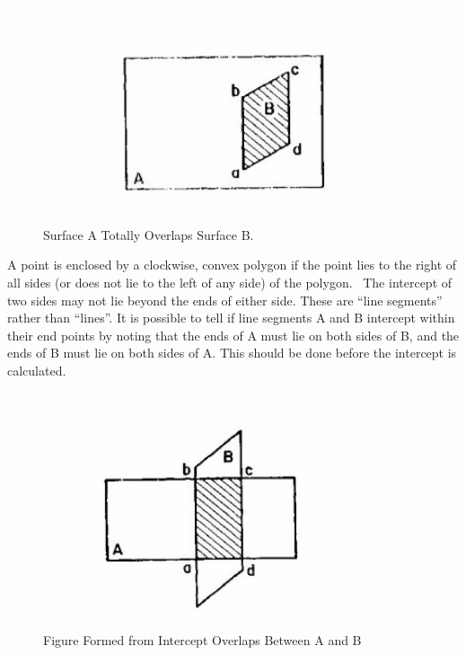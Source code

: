\begin{figure}[hbtp] %
\centering
\includegraphics[width=0.9\textwidth, height=0.9\textheight, keepaspectratio=true]{media/image638.png}
\caption{  Surface A Totally Overlaps Surface B. \protect \label{fig:surface-a-totally-overlaps-surface-b.}}
\end{figure}

A point is enclosed by a clockwise, convex polygon if the point lies to the right of all sides (or does not lie to the left of any side) of the polygon.~ The intercept of two sides may not lie beyond the ends of either side. These are ``line segments'' rather than ``lines''. It is possible to tell if line segments A and B intercept within their end points by noting that the ends of A must lie on both sides of B, and the ends of B must lie on both sides of A. This should be done before the intercept is calculated.

\begin{figure}[hbtp] %
\centering
\includegraphics[width=0.9\textwidth, height=0.9\textheight, keepaspectratio=true]{media/image639.png}
\caption{  Figure Formed from Intercept Overlaps Between A and B \protect \label{fig:figure-formed-from-intercept-overlaps-between}}
\end{figure}

